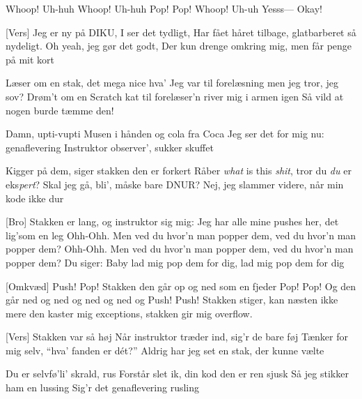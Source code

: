 \documentclass{article}
\begin{document}

\newpage

\begin{song}
[Intro]
%
Whoop! Uh-huh
Whoop! Uh-huh
Pop! Pop!
Whoop! Uh-uh
Yesss---
Okay!

[Vers]
%
Jeg er ny på DIKU, I ser det tydligt,
Har fået håret tilbage, glatbarberet så nydeligt.
Oh yeah, jeg gør det godt,
Der kun drenge omkring mig, men får penge på mit kort

%
Læser om en stak, det mega nice hva'
Jeg var til forelæsning men jeg tror, jeg sov?
Drøm't om en Scratch kat til forelæser'n river mig i armen igen
Så vild at nogen burde tæmme den!

%
Damn, upti-vupti
Musen i hånden og cola fra Coca
Jeg ser det for mig nu: genaflevering
Instruktor observer', sukker skuffet

%
    Kigger på dem, siger stakken den er forkert
    Råber \textit{what} is this \textit{shit}, tror du \textit{du} er eks\textit{pert}?
%
Skal jeg gå, bli', måske bare DNUR?
Nej, jeg slammer videre, når min kode ikke dur

[Bro]
%
Stakken er lang, og instruktor sig mig:
Jeg har alle mine pushes her, det lig'som en leg
Ohh-Ohh.
Men ved du hvor'n man popper dem, ved du hvor'n man popper dem?
Ohh-Ohh.
Men ved du hvor'n man popper dem, ved du hvor'n man popper dem?
Du siger:
%
Baby lad mig pop dem for dig, lad mig pop dem for dig

[Omkvæd]
%
Push! Pop! Stakken den går op og ned som en fjeder
Pop! Pop! Og den går ned og ned og ned og ned og
Push! Push! Stakken stiger, kan næsten ikke mere
%
den kaster mig exceptions, stakken gir mig overflow.

\newpage

[Vers]
%
Stakken var så høj
Når instruktor træder ind, sig'r de bare føj
%
Tænker for mig selv, ``hva' fanden er dét?''
Aldrig har jeg set en stak, der kunne vælte

Du er selvfø'li' skrald, rus
Forstår slet ik, din kod den er ren sjusk
Så jeg stikker ham en lussing
Sig'r det genaflevering rusling


\end{song}
\end{document}
